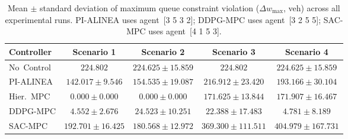 \begin{table}[htbp]
\centering
\caption{Mean $\pm$ standard deviation of maximum queue constraint violation ($\Delta w_{\max}$, veh) across all experimental runs. PI-ALINEA uses agent~[3 5 3 2]; DDPG-MPC uses agent~[3 2 5 5]; SAC-MPC uses agent~[4 1 5 3].}
\label{tab:dw_max_comparison_agent}
\begin{tabular}{lcccc}
\toprule
Controller & Scenario 1 & Scenario 2 & Scenario 3 & Scenario 4 \\
\midrule
No~Control & $224.802$ & $224.625 \pm 15.859$ & $224.802$ & $224.625 \pm 15.859$ \\
PI-ALINEA & $142.017 \pm 9.546$ & $154.535 \pm 19.087$ & $216.912 \pm 23.420$ & $193.166 \pm 30.104$ \\
Hier.~MPC & $0.000 \pm 0.000$ & $0.000 \pm 0.000$ & $171.625 \pm 13.844$ & $171.907 \pm 16.467$ \\
DDPG-MPC & $4.552 \pm 2.676$ & $24.523 \pm 10.251$ & $22.388 \pm 17.483$ & $4.781 \pm 8.189$ \\
SAC-MPC & $192.701 \pm 16.425$ & $180.568 \pm 12.972$ & $369.300 \pm 111.511$ & $404.979 \pm 167.731$ \\
\bottomrule
\end{tabular}
\end{table}
